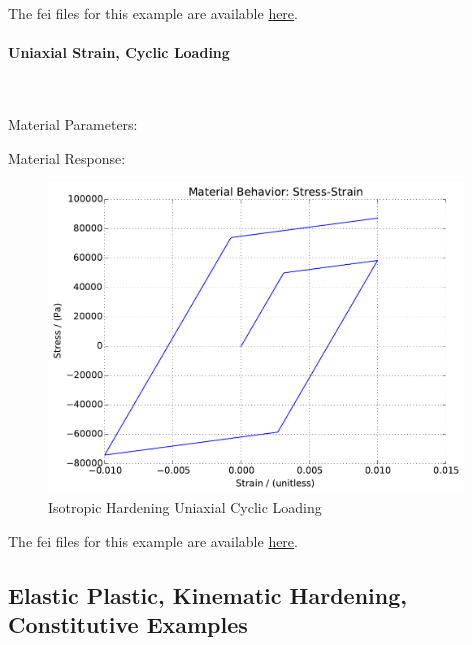 \documentclass[fleqn,11pt]{article}
\begin{document}
The fei files for this example are available \href{https://github.com/yuan-energy/education_examples/tree/master/fei_examples/elastoplastic_isotropic_hardening/3uniaxial_strain_mono_loading}{here}.

\newpage
\paragraph{Uniaxial Strain, Cyclic Loading} ~

Material Parameters:


Material Response:
\begin{figure}[H]
\begin{center}
\includegraphics[width=11cm]{../fei_examples/elastoplastic_isotropic_hardening/4uniaxial_strain_cyclic_loading/result.pdf}
\caption{
\label{Isotropic Hardening Uniaxial Cyclic Loading}
Isotropic Hardening Uniaxial Cyclic Loading}
\end{center}
\end{figure}

The fei files for this example are available \href{https://github.com/yuan-energy/education_examples/tree/master/fei_examples/elastoplastic_isotropic_hardening/4uniaxial_strain_cyclic_loading}{here}.



\newpage
\subsection{Elastic Plastic, Kinematic Hardening, Constitutive Examples}
\end{document}
